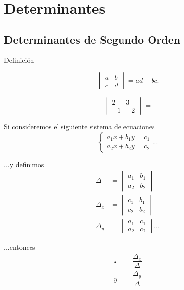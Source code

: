 
\section{Determinantes}

\subsection{Determinantes de Segundo Orden}

{Definición}
	\begin{defn}
		$$
		\begin{vmatrix}
			a & b \\ c & d
		\end{vmatrix}=ad-bc.
		$$
	\end{defn}
	



	\begin{problema}
		$$
		\begin{vmatrix} 2 & 3 \\ -1 & -2 \end{vmatrix}=
		$$
	\end{problema}
	



	Si consideremos el siguiente sistema de ecuaciones
	\begin{equation}
		\begin{cases}
			a_{1}x+b_{1}y=c_{1}\\
			a_{2}x+b_{2}y=c_{2}
		\end{cases}...
	\end{equation}
	



	...y definimos
	\begin{align*}
		\Delta&=\begin{vmatrix} a_{1} & b_{1} \\ a_{2} & b_{2} \end{vmatrix}\\
		\Delta_{x}&=\begin{vmatrix} c_{1} & b_{1} \\ c_{2} & b_{2} \end{vmatrix}\\
		\Delta_{y}&=\begin{vmatrix} a_{1} & c_{1} \\ a_{2} & c_{2} \end{vmatrix}...
	\end{align*}



	...entonces
	\begin{equation}
		\label{spi:28.2}
		\begin{split}
			x&=\dfrac{\Delta_{x}}{\Delta}\\
			y&=\dfrac{\Delta_{y}}{\Delta}
		\end{split}
	\end{equation}
	



